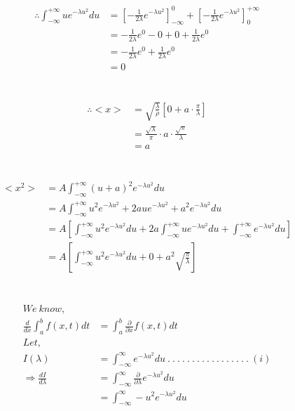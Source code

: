 \documentclass{article}
\begin{document}
\begin{homeworkProblem}
    \[
    \begin{split}
        \therefore  \int_{-\infty}^{+\infty} u e^{-\lambda u^2} du &= \left[- \frac{1}{2 \lambda}e^{-\lambda u^2} \right]_{-\infty}^{0} + \left[- \frac{1}{2\lambda} e^{-\lambda u^2} \right]_{0}^{+\infty}
        \\
        &= - \frac{1}{2 \lambda} e^0 - 0 + 0 + \frac{1}{2 \lambda} e^0
        \\
        &= - \frac{1}{2 \lambda} e^0 + \frac{1}{2 \lambda} e^0
        \\
        &= 0
    \end{split}
    \]
    \\
    \\
    \[
    \begin{split}
      \therefore < x > &= \sqrt{\frac{\lambda}{\rho}} [0 + a \cdot \frac{\pi}{\lambda}] 
      \\
      &= \frac{\sqrt{\lambda}}{\pi} \cdot a \cdot \frac{\sqrt{\pi}}{\lambda}
      \\
      &= a
    \end{split}
    \]
    \\
    \\
    \[
    \begin{split}
      < x^2 > &= A \int_{-\infty}^{+\infty} (u+a)^2 e^{-\lambda u^2} du
      \\
      &= A \int_{-\infty}^{+\infty} u^2e^{-\lambda u^2} + 2 a u e^{-\lambda u^2} + a^2 e^{-\lambda u^2} du
      \\
      &= A \left[ \int_{-\infty}^{+\infty} u^2 e^{-\lambda u^2} du + 2a \int_{-\infty}^{+\infty} u e^{-\lambda u^2} du + \int_{-\infty}^{+\infty} e^{-\lambda u^2} du \right]
      \\
      &= A \left[ \int_{-\infty}^{+\infty} u^2 e^{-\lambda u^2} du +
      0 + a^2 \sqrt{\frac{\pi}{\lambda}}\right]
    \end{split}
    \]
    \\\\
    
    \[
    \begin{split}
        We \ know,
        \\
        \frac{d}{dx} \int_{a}^{b} f(x,t) dt &= \int_{a}^{b} \frac{\partial}{\partial x} f(x,t) dt
        \\
        Let,
        \\
        I(\lambda) &= \int_{-\infty}^{\infty} e^{-\lambda u^2} du \ . \ . \ . \ . \ . \ . \ . \ . \ . \ . \ . \ . \ . \ . \ . \ . \ . \ (i)
        \\
        \Rightarrow \frac{dI}{d\lambda} &= \int_{-\infty}^{\infty} \frac{\partial}{\partial \lambda} e^{-\lambda u^2} du
        \\
        &= \int_{-\infty}^{\infty} -u^2 e^{-\lambda u^2} du
    \end{split}
    \]
\end{homeworkProblem}
\end{document}
